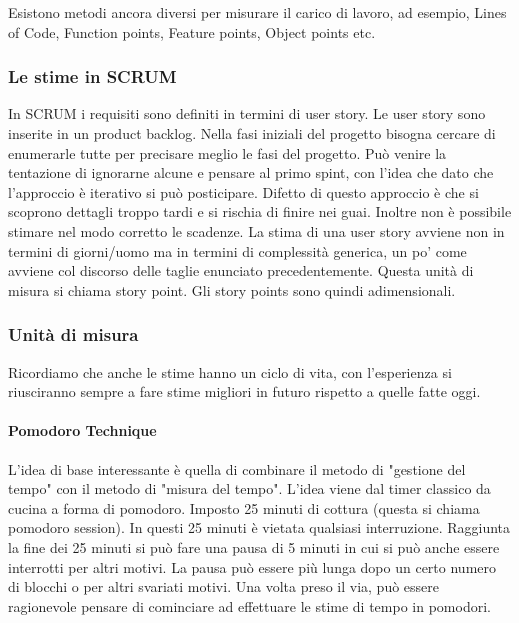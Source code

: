 \noindent Esistono metodi ancora diversi per misurare il carico di lavoro, ad esempio, Lines of Code, Function points, Feature points, Object points etc.

\subsubsection{Le stime in SCRUM}
In SCRUM i requisiti sono definiti in termini di user story. Le user story sono inserite in un product backlog. Nella fasi iniziali del progetto bisogna cercare di enumerarle tutte per precisare meglio le fasi del progetto. Può venire la tentazione di ignorarne alcune e pensare al primo spint, con l'idea che dato che l'approccio è iterativo si può posticipare. Difetto di questo approccio è che si scoprono dettagli troppo tardi e si rischia di finire nei guai. Inoltre non è possibile stimare nel modo corretto le scadenze. La stima di una user story avviene non in termini di giorni/uomo ma in termini di complessità generica, un po' come avviene col discorso delle taglie enunciato precedentemente. Questa unità di misura si chiama story point. Gli story points sono quindi adimensionali.
\subsubsection{Unità di misura}
Ricordiamo che anche le stime hanno un ciclo di vita, con l'esperienza si riusciranno sempre a fare stime migliori in futuro rispetto a quelle fatte oggi.
\paragraph{Pomodoro Technique}
L'idea di base interessante è quella di combinare il metodo di "gestione del tempo" con il metodo di "misura del tempo". L'idea viene dal timer classico da cucina a forma di pomodoro. Imposto 25 minuti di cottura (questa si chiama pomodoro session). In questi 25 minuti è vietata qualsiasi interruzione. Raggiunta la fine dei 25 minuti si può fare una pausa di 5 minuti in cui si può anche essere interrotti per altri motivi. La pausa può essere più lunga dopo un certo numero di blocchi o per altri svariati motivi.\newline
Una volta preso il via, può essere ragionevole pensare di cominciare ad effettuare le stime di tempo in pomodori.
